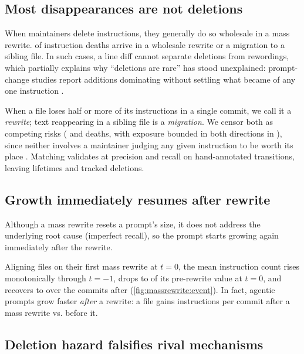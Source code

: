 \subsection{Most disappearances are not deletions}
\label{sec:measurement}

When maintainers delete instructions, they generally do so wholesale in a mass rewrite.
\FieldCensoredDeathShare{} of instruction deaths arrive in a wholesale rewrite or a migration to a sibling
file. In such cases, a line diff cannot separate deletions from rewordings, which partially explains why
``deletions are rare'' has
stood unexplained: prompt-change studies report additions dominating without settling what became of any one
instruction \citep{tafreshipour2025promptinthewild}.

When a file loses half or more of its instructions in a single commit, we call it a \emph{rewrite}; text
reappearing in a sibling file is a \emph{migration}. We censor both as competing risks (\FieldRewriteDeaths{}
and \FieldMigrationDeaths{} deaths, with exposure bounded in both directions in ),
since neither involves a maintainer judging any given instruction to be worth its place \citep{march2000dynamics}.
Matching validates at \GateBPrecision{} precision and \GateBRecall{} recall on \GateBPool{} hand-annotated
transitions, leaving \FieldSpells{} lifetimes and \FieldDeletions{} tracked deletions.

\subsection{Growth immediately resumes after rewrite}
\label{sec:rewrite}

Although a mass rewrite resets a prompt's size, it does not address the underlying root cause (imperfect
recall), so the prompt starts growing again immediately after the rewrite.

Aligning files on their first mass rewrite at $t = 0$, the mean instruction count rises monotonically through
$t = -1$, drops to \RewriteDropPct{} of its pre-rewrite value at $t = 0$, and recovers to
\RewriteReboundPct{} over the \RewriteEventWindow{} commits after (\autoref{fig:massrewrite:event}). In fact,
agentic prompts grow faster \emph{after} a rewrite: a file gains \RewriteGrowthPostCommit{} instructions per
commit after a mass rewrite vs. \RewriteGrowthPreCommit{} before it.



\subsection{Deletion hazard falsifies rival mechanisms}
\label{sec:hazard}


